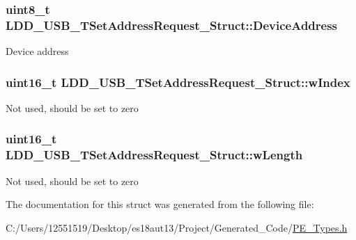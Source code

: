 \subsubsection[{Device\+Address}]{\setlength{\rightskip}{0pt plus 5cm}uint8\+\_\+t L\+D\+D\+\_\+\+U\+S\+B\+\_\+\+T\+Set\+Address\+Request\+\_\+\+Struct\+::\+Device\+Address}\label{struct_l_d_d___u_s_b___t_set_address_request___struct_ac55059f77c050ba97d5f0d9b2b3a52c9}
Device address \hypertarget{struct_l_d_d___u_s_b___t_set_address_request___struct_ab6a26adfbbc2e164679a4d7dcf5c99d0}{}
\subsubsection[{w\+Index}]{\setlength{\rightskip}{0pt plus 5cm}uint16\+\_\+t L\+D\+D\+\_\+\+U\+S\+B\+\_\+\+T\+Set\+Address\+Request\+\_\+\+Struct\+::w\+Index}\label{struct_l_d_d___u_s_b___t_set_address_request___struct_ab6a26adfbbc2e164679a4d7dcf5c99d0}
Not used, should be set to zero \hypertarget{struct_l_d_d___u_s_b___t_set_address_request___struct_adff24e6d3ec27fce1f59693aa215deda}{}
\subsubsection[{w\+Length}]{\setlength{\rightskip}{0pt plus 5cm}uint16\+\_\+t L\+D\+D\+\_\+\+U\+S\+B\+\_\+\+T\+Set\+Address\+Request\+\_\+\+Struct\+::w\+Length}\label{struct_l_d_d___u_s_b___t_set_address_request___struct_adff24e6d3ec27fce1f59693aa215deda}
Not used, should be set to zero 

The documentation for this struct was generated from the following file\+:\begin{DoxyCompactItemize}
\item 
C\+:/\+Users/12551519/\+Desktop/es18aut13/\+Project/\+Generated\+\_\+\+Code/\hyperlink{_p_e___types_8h}{P\+E\+\_\+\+Types.\+h}\end{DoxyCompactItemize}
